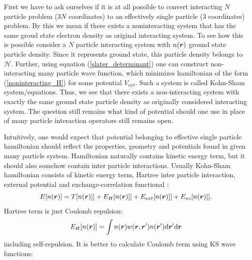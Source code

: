\documentclass[openany, longbibliography,slovene,a4paper,12pt]{article}
\def\vec#1{\mbox{\boldmath$#1$}}
\newcommand{\dif}{\mathrm{d}}
\begin{document}
First we have to ask ourselves if it is at all possible to convert interacting
$N$ particle problem ($3N$ coordinates) to an effectively single particle (3 coordinates)
problem. By this we mean if there exists a noninteracting system that has the
same groud state electron density as original interacting system.
To see how this is possible consider a $N$ particle interacting system
with $n(\vec r)$ ground state particle density. Since it represents ground
state,  this particle density belongs to $\mathcal H$. Further, using equation
(\ref{slater_determinant}) one can construct non-interacting many particle wave
function, which minimizes hamiltonian of the form (\ref{noninteracting_H})
for some potential $V_{ext}$. Such a system is called Kohn-Sham system/equations.
Thus, we see that there exists a non-interacting system with exactly the same
ground state particle density as originally considered interacting system. The
question still remains what kind of potential should one use in place of many
particle interaction operators still remains open.

Intuitively, one would expect that potential belonging to effective single
particle hamiltonian should reflect the properties, geometry and potentials found
in given many particle system. Hamiltonian naturally contains kinetic energy
term, but it should also somehow contain inter particle interactions. Usually
Kohn-Sham hamiltonian consists of kinetic energy term, Hartree inter particle
interaction, external potential and exchange-correlation functional \cite{advanced_course}:
\begin{equation} \label{KS_system}
  E[n(\vec r)]=T[n(\vec r)]] + E_H[n(\vec r)]] + E_{ext}[n(\vec r)]] + E_{xc}[n(\vec r)]].
\end{equation}
Hartree term is just Coulomb repulsion:
\begin{equation} \label{hartree_term1}
  E_H[n(\vec r)] = \int n(\vec r)w(\vec r, \vec r') n(\vec r')\dif \vec r' \dif \vec r
\end{equation}
including self-repulsion. It is better to calculate Coulomb term using KS wave functions:
\end{document}
